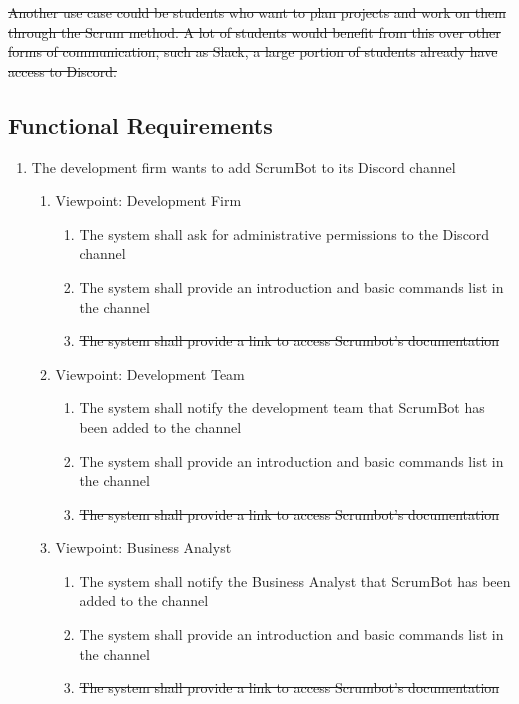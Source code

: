 \documentclass[12pt, titlepage]{article}
\begin{document}
\sout{Another use case could be students who want to plan projects and work on them through the Scrum method. A lot of students would benefit from this over other forms of communication, such as Slack, a large portion of students already have access to Discord.}

\subsection{Functional Requirements}
\begin{enumerate}[{BE}1.]
    \item The development firm wants to add ScrumBot to its Discord channel
    \begin{enumerate}[{VP}1.]
        \item Viewpoint: Development Firm
            \begin{enumerate}
                \item The system shall ask for administrative permissions to the Discord channel
                \item The system shall provide an introduction and basic commands list in the channel
                \item \sout{The system shall provide a link to access Scrumbot's documentation}
            \end{enumerate}
        \item Viewpoint: Development Team
            \begin{enumerate}
                \item The system shall notify the development team that ScrumBot has been added to the channel
                \item The system shall provide an introduction and basic commands list in the channel
                \item \sout{The system shall provide a link to access Scrumbot's documentation}
            \end{enumerate}
            
        \item Viewpoint: Business Analyst
            \begin{enumerate}
                \item The system shall notify the Business Analyst that ScrumBot has been added to the channel
                \item The system shall provide an introduction and basic commands list in the channel
                \item \sout{The system shall provide a link to access Scrumbot's documentation}
            \end{enumerate}
            

\end{enumerate}
\end{enumerate}
\end{document}
